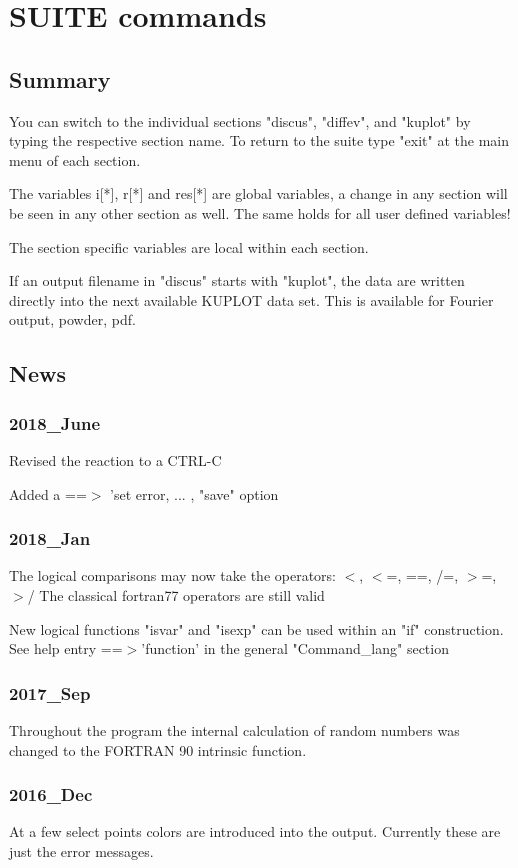 \chapter{SUITE commands}
\section{Summary}
\par
You can switch to the individual sections "discus", "diffev", 
and "kuplot" by typing the respective section name. To return 
to the suite type "exit" at the main menu of each section. 
\par
The variables i[*], r[*] and res[*] are global variables, 
a change in any section will be seen in any other section 
as well. 
The same holds for all user defined variables! 
\par
The section specific variables are local within each section. 
\par
If an output filename in "discus" starts with "kuplot", the 
data are written directly into the next available KUPLOT 
data set. This is available for Fourier output, powder, pdf. 
\section{News}
\subsection*{2018\_June}
\par
Revised the reaction to a CTRL-C 
\par
Added a ==$> $ 'set error, ... , "save" option 
\subsection*{2018\_Jan}
\par
The logical comparisons may now take the operators: 
$ <$, $ <$=, ==, /=, $> $=, $> $/ 
The classical fortran77 operators are still valid 
\par
New logical functions "isvar" and "isexp" can be used within an 
"if" construction. See help entry ==$> $'function' in the 
general "Command\_lang" section 
\subsection*{2017\_Sep}
\par
Throughout the program the internal calculation of random numbers 
was changed to the FORTRAN 90 intrinsic function. 
\subsection*{2016\_Dec}
\par
At a few select points colors are introduced into the output. 
Currently these are just the error messages. 
